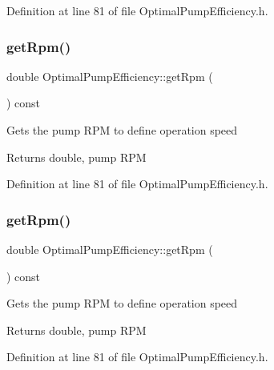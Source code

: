Definition at line 81 of file Optimal\+Pump\+Efficiency.\+h.

\mbox{\label{class_optimal_pump_efficiency_a58e8a430ced612e0518abd07fb30b085}} 
\subsubsection{\texorpdfstring{get\+Rpm()}{getRpm()}\hspace{0.1cm}{\footnotesize\ttfamily [2/3]}}
{\footnotesize\ttfamily double Optimal\+Pump\+Efficiency\+::get\+Rpm (\begin{DoxyParamCaption}{ }\end{DoxyParamCaption}) const\hspace{0.3cm}{\ttfamily [inline]}}

Gets the pump R\+PM to define operation speed \begin{DoxyReturn}{Returns}
double, pump R\+PM 
\end{DoxyReturn}


Definition at line 81 of file Optimal\+Pump\+Efficiency.\+h.

\mbox{\label{class_optimal_pump_efficiency_a58e8a430ced612e0518abd07fb30b085}} 
\subsubsection{\texorpdfstring{get\+Rpm()}{getRpm()}\hspace{0.1cm}{\footnotesize\ttfamily [3/3]}}
{\footnotesize\ttfamily double Optimal\+Pump\+Efficiency\+::get\+Rpm (\begin{DoxyParamCaption}{ }\end{DoxyParamCaption}) const\hspace{0.3cm}{\ttfamily [inline]}}

Gets the pump R\+PM to define operation speed \begin{DoxyReturn}{Returns}
double, pump R\+PM 
\end{DoxyReturn}


Definition at line 81 of file Optimal\+Pump\+Efficiency.\+h.

